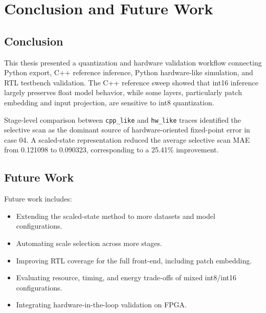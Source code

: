 \chapter{Conclusion and Future Work}
\label{ch:conclusion}

\section{Conclusion}

This thesis presented a quantization and hardware validation workflow connecting Python export, C++ reference inference, Python hardware-like simulation, and RTL testbench validation. The C++ reference sweep showed that int16 inference largely preserves float model behavior, while some layers, particularly patch embedding and input projection, are sensitive to int8 quantization.

Stage-level comparison between \texttt{cpp\_like} and \texttt{hw\_like} traces identified the selective scan as the dominant source of hardware-oriented fixed-point error in case 04. A scaled-state representation reduced the average selective scan MAE from 0.121098 to 0.090323, corresponding to a 25.41\% improvement.

\section{Future Work}

Future work includes:

\begin{itemize}
  \item Extending the scaled-state method to more datasets and model configurations.
  \item Automating scale selection across more stages.
  \item Improving RTL coverage for the full front-end, including patch embedding.
  \item Evaluating resource, timing, and energy trade-offs of mixed int8/int16 configurations.
  \item Integrating hardware-in-the-loop validation on FPGA.
\end{itemize}

